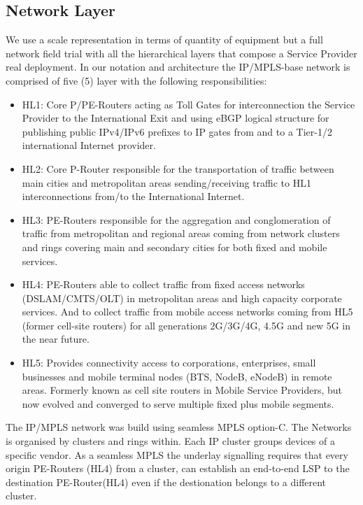 \documentclass[a4paper,fleqn]{cas-dc}
\begin{document}
\subsection{Network Layer}
\label{sec:net_lay}
We use a scale representation in terms of quantity of equipment but a full network field trial with all the hierarchical layers that compose a Service Provider real deployment. In our notation and architecture the IP/MPLS-base network is comprised of five (5) layer with the following responsibilities: 
\begin{itemize}
    \item HL1: Core P/PE-Routers acting as Toll Gates for interconnection the Service Provider to the International Exit and using eBGP logical structure for publishing public IPv4/IPv6 prefixes to IP gates from and to a Tier-1/2 international Internet provider.
    \item HL2: Core P-Router responsible for the transportation of traffic between main cities and metropolitan areas sending/receiving traffic to HL1 interconnections from/to the International Internet.
    \item HL3: PE-Routers responsible for the aggregation and conglomeration of traffic from metropolitan and regional areas coming from network clusters and rings covering main and secondary cities for both fixed and mobile services.
    \item HL4: PE-Routers able to collect traffic from fixed access networks (DSLAM/CMTS/OLT) in metropolitan areas and high capacity corporate services. And to collect traffic from mobile access networks coming from HL5 (former cell-site routers) for all generations 2G/3G/4G, 4.5G and new 5G in the near future.
    \item HL5: Provides connectivity access to corporations, enterprises, small businesses and mobile terminal nodes (BTS, NodeB, eNodeB) in remote areas. Formerly known as cell site routers in Mobile Service Providers, but now evolved and converged to serve multiple fixed plus mobile segments.     
\end{itemize}

The IP/MPLS network was build using seamless MPLS option-C. The Networks is organised by clusters and rings within. Each IP cluster groups devices of a specific vendor. As a seamless MPLS the underlay signalling requires that every origin PE-Routers (HL4) from a cluster, can establish an end-to-end LSP to the destination PE-Router(HL4) even if the destionation belongs to a different cluster. 
\end{document}
